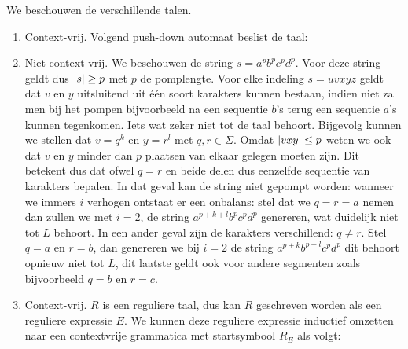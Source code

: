 \documentclass{article}
\begin{document}
\begin{answer}
We beschouwen de verschillende talen.
\begin{enumerate}
 \item Context-vrij. Volgend push-down automaat beslist de taal:
 \begin{center}
 \end{center}
 \item Niet context-vrij. We beschouwen de string $s=a^pb^pc^pd^p$. Voor deze string geldt dus $\left|s\right|\geq p$ met $p$ de pomplengte. Voor elke indeling $s=uvxyz$ geldt dat $v$ en $y$ uitsluitend uit \'e\'en soort karakters kunnen bestaan, indien niet zal men bij het pompen bijvoorbeeld na een sequentie $b$'s terug een sequentie $a$'s kunnen tegenkomen. Iets wat zeker niet tot de taal behoort. Bijgevolg kunnen we stellen dat $v=q^k$ en $y=r^l$ met $q,r\in\Sigma$. Omdat $\left|vxy\right|\leq p$ weten we ook dat $v$ en $y$ minder dan $p$ plaatsen van elkaar gelegen moeten zijn. Dit betekent dus dat ofwel $q=r$ en beide delen dus eenzelfde sequentie van karakters bepalen. In dat geval kan de string niet gepompt worden: wanneer we immers $i$ verhogen ontstaat er een onbalans: stel dat we $q=r=a$ nemen dan zullen we met $i=2$, de string $a^{p+k+l}b^pc^pd^p$ genereren, wat duidelijk niet tot $L$ behoort. In een ander geval zijn de karakters verschillend: $q\neq r$. Stel $q=a$ en $r=b$, dan genereren we bij $i=2$ de string $a^{p+k}b^{p+l}c^pd^p$ dit behoort opnieuw niet tot $L$, dit laatste geldt ook voor andere segmenten zoals bijvoorbeeld $q=b$ en $r=c$.
 \item Context-vrij. $R$ is een reguliere taal, dus kan $R$ geschreven worden als een reguliere expressie $E$. We kunnen deze reguliere expressie inductief omzetten naar een contextvrije grammatica met startsymbool $R_E$ als volgt:

\end{enumerate}
\end{answer}
\end{document}
